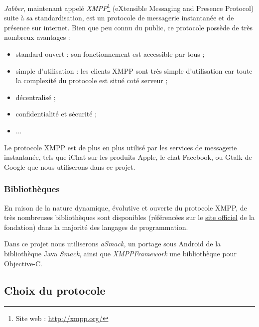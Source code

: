 \textit{Jabber}, maintenant appelé \textit{XMPP}\footnote{Site web : \href{http://xmpp.org/}{http://xmpp.org/}} (eXtensible Messaging and Presence Protocol) suite à sa standardisation, est un protocole de messagerie instantanée et de présence sur internet.
Bien que peu connu du public, ce protocole possède de très nombreux avantages :
\begin{itemize}
	\item standard ouvert : son fonctionnement est accessible par tous ;
	\item simple d'utilisation : les clients XMPP sont très simple d'utilisation car toute la complexité du protocole est situé coté serveur ;
	\item décentralisé ;
	\item confidentialité et sécurité ;
	\item ...
\\
\end{itemize}


Le protocole XMPP est de plus en plus utilisé par les services de messagerie instantanée, tels que iChat sur les produits Apple, le chat Facebook, ou Gtalk de Google que nous utiliserons dans ce projet.


\subsubsection{Bibliothèques}

En raison de la nature dynamique, évolutive et ouverte du protocole XMPP, de très nombreuses bibliothèques sont disponibles (référencées sur le \href{http://xmpp.org/xmpp-software/libraries/}{site officiel} de la fondation) dans la majorité des langages de programmation.

Dans ce projet nous utiliserons \textit{aSmack}, un portage sous Android de la bibliothèque Java \textit{Smack}, ainsi que \textit{XMPPFramework} une bibliothèque pour Objective-C.




\subsection{Choix du protocole}

